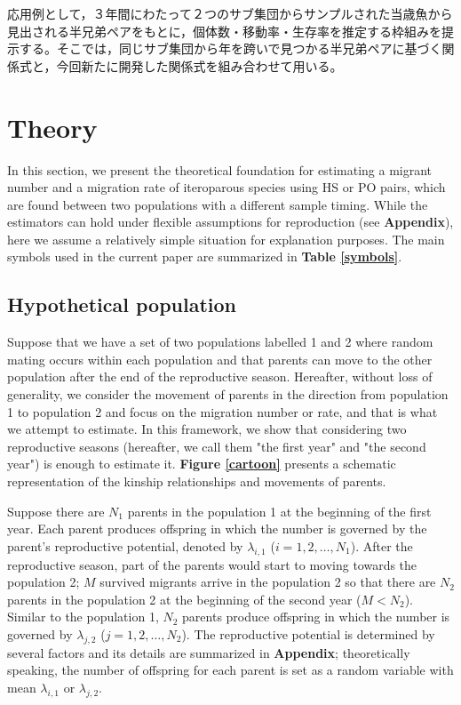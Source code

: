 \documentclass[12pt, English]{article}
\begin{document}
\begin{spacing}{1.9}
応用例として，３年間にわたって２つのサブ集団からサンプルされた当歳魚から見出される半兄弟ペアをもとに，個体数・移動率・生存率を推定する枠組みを提示する。そこでは，同じサブ集団から年を跨いで見つかる半兄弟ペアに基づく関係式と，今回新たに開発した関係式を組み合わせて用いる。

\section{Theory}\label{sec2}
In this section, we present the theoretical foundation for estimating a migrant number and a migration rate of iteroparous species using HS or PO pairs, which are found between two populations with a different sample timing. While the estimators can hold under flexible assumptions for reproduction (see {\bf Appendix}), here we assume a relatively simple situation for explanation purposes. The main symbols used in the current paper are summarized in {\bf Table \ref{symbols}}. 

\begin{center}
\end{center}

\subsection{Hypothetical population}

Suppose that we have a set of two populations labelled 1 and 2 where random mating occurs within each population and that parents can move to the other population after the end of the reproductive season. Hereafter, without loss of generality, we consider the movement of parents in the direction from population 1 to population 2 and focus on the migration number or rate, and that is what we attempt to estimate. In this framework, we show that considering two reproductive seasons (hereafter, we call them "the first year" and "the second year") is enough to estimate it. {\bf Figure \ref{cartoon}} presents a schematic representation of the kinship relationships and movements of parents. 

Suppose there are $N_1$ parents in the population 1 at the beginning of the first year. Each parent produces offspring in which the number is governed by the parent's reproductive potential, denoted by $\lambda_{i,1}$ ($i=1,2,\ldots,N_1$). After the reproductive season, part of the parents would start to moving towards the population 2; $M$ survived migrants arrive in the population 2 so that there are $N_2$ parents in the population 2 at the beginning of the second year ($M < N_2$). Similar to the population 1, $N_2$ parents produce offspring in which the number is governed by $\lambda_{j,2}$ ($j=1,2,\ldots,N_2$). The reproductive potential is determined by several factors and its details are summarized in {\bf Appendix}; theoretically speaking, the number of offspring for each parent is set as a random variable with mean $\lambda_{i,1}$ or $\lambda_{j,2}$. 


\end{spacing}
\end{document}
